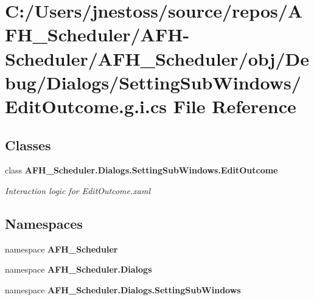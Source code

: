 \section{C\+:/\+Users/jnestoss/source/repos/\+A\+F\+H\+\_\+\+Scheduler/\+A\+F\+H-\/\+Scheduler/\+A\+F\+H\+\_\+\+Scheduler/obj/\+Debug/\+Dialogs/\+Setting\+Sub\+Windows/\+Edit\+Outcome.g.\+i.\+cs File Reference}
\label{_edit_outcome_8g_8i_8cs}
\subsection*{Classes}
\begin{DoxyCompactItemize}
\item 
class \textbf{ A\+F\+H\+\_\+\+Scheduler.\+Dialogs.\+Setting\+Sub\+Windows.\+Edit\+Outcome}
\begin{DoxyCompactList}\small\item\em Interaction logic for Edit\+Outcome.\+xaml \end{DoxyCompactList}\end{DoxyCompactItemize}
\subsection*{Namespaces}
\begin{DoxyCompactItemize}
\item 
namespace \textbf{ A\+F\+H\+\_\+\+Scheduler}
\item 
namespace \textbf{ A\+F\+H\+\_\+\+Scheduler.\+Dialogs}
\item 
namespace \textbf{ A\+F\+H\+\_\+\+Scheduler.\+Dialogs.\+Setting\+Sub\+Windows}
\end{DoxyCompactItemize}
